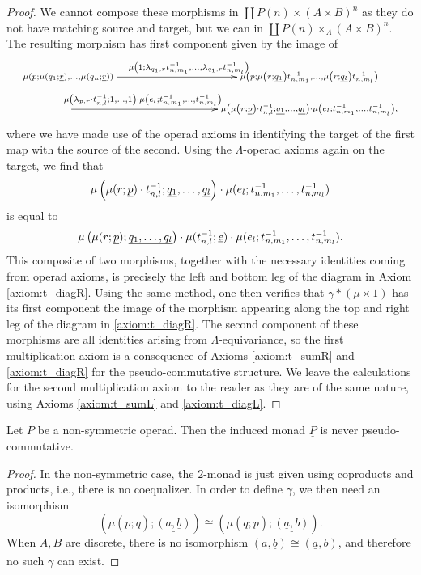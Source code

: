 \begin{proof}
We cannot compose these morphisms in $\coprod P(n) \times (A \times B)^{n}$ as they do not have matching source and target, but we can in $\coprod P(n) \times_{\Lambda} (A \times B)^{n}$. The resulting morphism has first component given by the image of
  \[
    \xy
      {\ar^{\scriptstyle \mu\left(1; \lambda_{q_{1}, r} t^{-1}_{n,m_{1}}, \ldots, \lambda_{q_{1}, r} t^{-1}_{n,m_{l}}\right)} (0,0)*+{\scriptstyle \mu\left(p; \mu\left(q_{1}; \un{r}\right), \ldots, \mu\left(q_{n}; \un{r}\right)\right)}; (75,0)*+{\scriptstyle \mu\left(p; \mu\left(r; \un{q_{1}}\right) t^{-1}_{n,m_{1}}, \ldots, \mu\left(r; \un{q_{l}}\right) t^{-1}_{n,m_{l}} \right)} };
      {\ar^<<<<<<<<<<<<<<<<<<<<<<{\scriptstyle \mu\left(\lambda_{p,r} \cdot t^{-1}_{n,l}; 1, \ldots, 1\right)\cdot \mu\left(e_{l}; t^{-1}_{n,m_{1}}, \ldots, t^{-1}_{n,m_{l}}\right)} (0,-10)*+{}; (75,-10)*+{\scriptstyle \mu\left(\mu\left(r; \un{p}\right)\cdot t^{-1}_{n,l}; \un{q_{1}}, \ldots, \un{q_{l}}\right)\cdot \mu\left(e_{l}; t^{-1}_{n,m_{1}}, \ldots, t^{-1}_{n,m_{l}}\right),} }
    \endxy
  \]
where we have made use of the operad axioms in identifying the target of the first map with the source of the second. Using the $\Lambda$-operad axioms again on the target, we find that
  \[
    \mu\left(\mu(r; \underline{p})\cdot t^{-1}_{n,l}; \underline{q_{1}}, \ldots, \underline{q_{l}}\right)\cdot \mu(e_{l}; t^{-1}_{n,m_{1}}, \ldots, t^{-1}_{n,m_{l}})
  \]
is equal to
  \[
    \mu\left(\mu(r; \underline{p}); \underline{q_{1}, \ldots, q_{l}}\right) \cdot \mu(t^{-1}_{n,l}; \underline{e}) \cdot \mu(e_{l}; t^{-1}_{n,m_{1}}, \ldots, t^{-1}_{n,m_{l}}).
  \]
This composite of two morphisms, together with the necessary identities coming from operad axioms, is precisely the left and bottom leg of the diagram in Axiom \ref{axiom:t_diagR}. Using the same method, one then verifies that $\gamma * (\mu \times 1)$ has its first component the image of the morphism appearing along the top and right leg of the diagram in \ref{axiom:t_diagR}. The second component of these morphisms are all identities arising from $\Lambda$-equivariance, so the first multiplication axiom is a consequence of Axioms \ref{axiom:t_sumR} and \ref{axiom:t_diagR} for the pseudo-commutative structure. We leave the calculations for the second multiplication axiom to the reader as they are of the same nature, using Axioms \ref{axiom:t_sumL} and \ref{axiom:t_diagL}.
\end{proof}

\begin{cor}
Let $P$ be a non-symmetric operad. Then the induced monad $\underline{P}$ is never pseudo-commutative.
\end{cor}
\begin{proof}
In the non-symmetric case, the $2$-monad is just given using coproducts and products, i.e., there is no coequalizer. In order to define $\gamma$, we then need an isomorphism
  \[
    \left(\mu(p; \underline{q}); \underline{(a, \underline{b})}\right) \cong \left(\mu(q; \underline{p}); \underline{(\underline{a},b)}\right).
  \]
When $A,B$ are discrete, there is no isomorphism $\underline{\left(a,\underline{b}\right)} \cong \underline{\left(\underline{a},b\right)}$, and therefore no such $\gamma$ can exist.
\end{proof}



